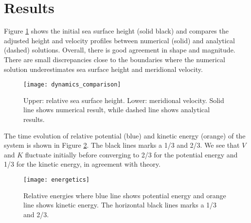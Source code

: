 \section{Results}
\label{sec:results}

Figure \ref{fig:dynamics} shows the initial sea surface height (solid black) and compares the adjusted height and velocity profiles between numerical (solid) and analytical (dashed) solutions. Overall, there is good agreement in shape and magnitude. There are small discrepancies close to the boundaries where the numerical solution underestimates sea surface height and meridional velocity.
\begin{figure}[htbp]
	\centering
	\texttt{[image: dynamics\_comparison]}
	\caption{Upper: relative sea surface height. Lower: meridional velocity. Solid line shows numerical result, while dashed line shows analytical results.}
	\label{fig:dynamics}
\end{figure}

The time evolution of relative potential (blue) and kinetic energy (orange) of the system is shown in Figure \ref{fig:energetics}. The black lines marks a 1/3 and 2/3. We see that $V$ and $K$ fluctuate initially before converging to 2/3 for the potential energy and 1/3 for the kinetic energy, in agreement with theory.
\begin{figure}[htbp]
	\centering
	\texttt{[image: energetics]}
	\caption{Relative energies where blue line shows potential energy and orange line shows kinetic energy. The horizontal black lines marks a 1/3 and 2/3.}
	\label{fig:energetics}
\end{figure}